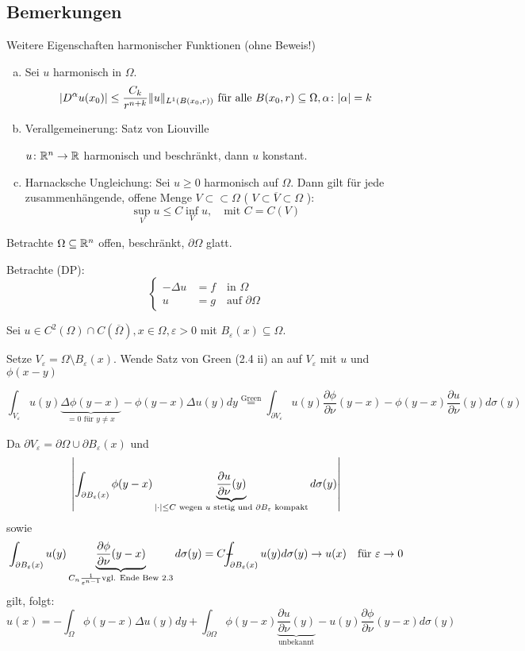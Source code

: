 \subsection{Bemerkungen}

Weitere Eigenschaften harmonischer Funktionen (ohne Beweis!)
\begin{enumerate}[a)]
  \item Sei $u$ harmonisch in $\Omega$.
    $$
    |D^\alpha u(x_0)| \leq \frac{C_k}{r^{n + k}} \lVert u \rVert_{L^1(B(x_0,r))} \text{ für alle } B(x_0, r) \subseteq \Omega, \alpha \colon |\alpha| = k
    $$
  \item Verallgemeinerung: Satz von Liouville

    $u \colon \mathbb{R}^n \to \mathbb{R}$ harmonisch und beschränkt, dann $u$ konstant.

    \item Harnacksche Ungleichung:
    Sei $u \geq 0$ harmonisch auf $\Omega$. Dann gilt für jede zusammenhängende, offene Menge $V \subset\subset \Omega$ ( $V \subset \overline V \subset \Omega$ ):
    $$ \sup_V u \leq C \inf_V u, \quad \text{mit } C = C(V) $$ 
\end{enumerate}

Betrachte $\Omega \subseteq \mathbb{R}^n$ offen, beschränkt, $\partial \Omega$ glatt.

Betrachte (DP):
$$
\begin{cases}
  -\Delta u &= f \quad\text{in } \Omega \\
  u &= g \quad\text{auf } \partial\Omega
\end{cases}
$$

Sei $u \in C^2(\Omega) \cap C(\overline \Omega), x \in \Omega, \varepsilon > 0$ mit $B_\varepsilon(x) \subseteq \Omega$.

Setze $V_\varepsilon = \Omega \setminus B_\varepsilon(x)$. Wende Satz von Green (2.4 ii) an auf $V_\varepsilon$ mit $u$ und $\phi(x -y)$

$$
\int_{V_\varepsilon} u(y) \underbrace{\Delta \phi(y - x)}_{= 0 \text{ für } y \neq x} - \phi(y - x)\Delta u(y) dy
\overset{\text{Green}}{=} \int_{\partial V_\varepsilon} u(y) \frac{\partial \phi}{\partial \nu}(y - x) - \phi(y - x) \frac{\partial u}{\partial \nu}(y) d\sigma(y)
$$

Da $\partial V_\varepsilon = \partial \Omega \cup \partial B_\varepsilon(x)$ und
$$
\left| \int_{\partial B_\varepsilon(x)} \phi(y - x) \underbrace{\frac{\partial u}{\partial \nu}(y)}_{|\cdot| \leq C \\\text{ wegen $u$ stetig und $\partial B_\varepsilon$ kompakt}} d\sigma(y) \right|
$$
sowie
$$
\int_{\partial B_\varepsilon(x)} u(y) \underbrace{\frac{\partial \phi}{\partial \nu} (y - x)}_{C_n \frac{1}{\varepsilon^{n - 1}} \\\text{vgl. Ende Bew 2.3}} d\sigma(y)
= C \dashint_{\partial B_\varepsilon(x)} u(y) d\sigma(y) \to u(x) \quad\text{für } \varepsilon \to 0
$$
gilt, folgt:
\begin{displaymath}
  u(x) = -\int_\Omega \phi(y - x) \Delta u(y) dy + \int_{\partial \Omega} \phi(y - x) \underbrace{\frac{\partial u}{\partial \nu}(y)}_{\text{unbekannt}} - u(y) \frac{\partial \phi}{\partial \nu}(y - x) d\sigma(y) \tag{1}
\end{displaymath}

